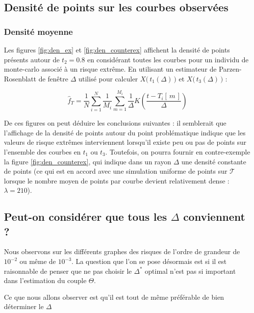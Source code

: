 \subsection{Densité de points sur les courbes observées}

\subsubsection{Densité moyenne}

Les figures \ref{fig:den_ex} et \ref{fig:den_counterex} affichent la densité de points présents autour de $t_2 = 0.8$ en considérant toutes les courbes pour un individu de monte-carlo associé à un risque extrême. En utilisant un estimateur de Parzen-Rosenblatt de fenêtre $\Delta$ utilisé pour calculer $X\bigl( \, t_1(\Delta) \, \bigr)$ et $X\bigl( \, t_3(\Delta) \, \bigr)$ :

\begin{equation*}
	\widehat f_T = \frac 1 N \sum\limits_{i=1}^N \frac 1 {M_i} \sum\limits_{m=1}^{M_i} \frac 1 \Delta K\left( \frac{t - T_i[\, m \, ]}{\Delta} \right)
\end{equation*}

De ces figures on peut déduire les conclusions suivantes : il semblerait que l'affichage de la densité de points autour du point problématique indique que les valeurs de risque extrêmes interviennent lorsqu'il existe peu ou pas de points sur l'ensemble des courbes en $t_1$ ou $t_3$. Toutefois, on pourra fournir en contre-exemple la figure \ref{fig:den_counterex}, qui indique dans un rayon $\Delta$ une densité constante de points (ce qui est en accord avec une simulation uniforme de points sur $\mathcal T$ lorsque le nombre moyen de points par courbe devient relativement dense : $\lambda = 210$).



\subsection{Peut-on considérer que tous les $\Delta$ conviennent ?}

Nous observons sur les différents graphes des risques de l'ordre de grandeur de $10^{-2}$ ou même de $10^{-3}$. La question que l'on se pose désormais est si il est raisonnable de penser que ne pas choisir le $\Delta^*$ optimal n'est pas si important dans l'estimation du couple $\Theta$.

Ce que nous allons observer est qu'il est tout de même préférable de bien déterminer le $\Delta$

